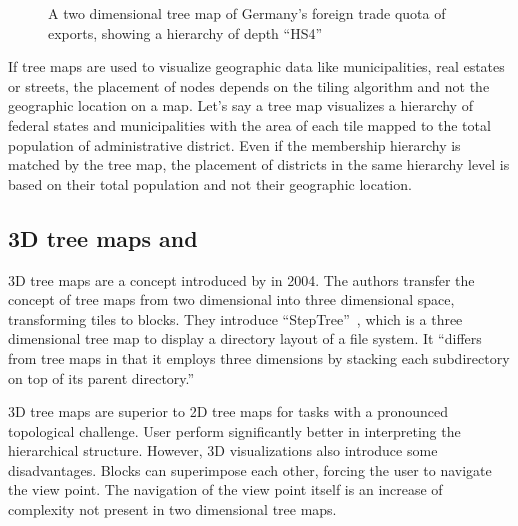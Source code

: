 \begin{figure}[ht]
    \centering
    \caption{A two dimensional tree map of Germany's foreign trade quota of exports, showing a hierarchy of depth ``HS4''}\label{fig:related-work:treemap-german-exports-2}
\end{figure}
If tree maps are used to visualize geographic data like municipalities, real estates or streets, the placement of nodes depends on the tiling algorithm and not the geographic location on a map.
Let's say a tree map visualizes a hierarchy of federal states and municipalities with the area of each tile mapped to the total population of administrative district.
Even if the membership hierarchy is matched by the tree map, the placement of districts in the same hierarchy level is based on their total population and not their geographic location.

\subsection{3D tree maps and \tmaps{}}
3D tree maps are a concept introduced by \textcite{Bladh2004} in 2004.
The authors transfer the concept of tree maps from two dimensional into three dimensional space, transforming tiles to blocks.
They introduce ``StepTree''~\cite{Bladh2004}, which is a three dimensional tree map to display a directory layout of a file system.
It ``differs from tree maps in that it employs three dimensions by stacking each subdirectory on top of its parent directory.''

3D tree maps are superior to 2D tree maps for tasks with a pronounced topological challenge.
User perform significantly better in interpreting the hierarchical structure.
However, 3D visualizations also introduce some disadvantages.
Blocks can superimpose each other, forcing the user to navigate the view point.
The navigation of the view point itself is an increase of complexity not present in two dimensional tree maps.

